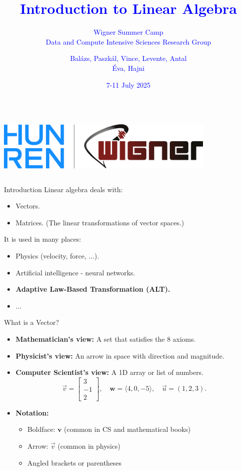 \documentclass{beamer}
\title{\textcolor{blue}{Introduction to Linear Algebra}}
\subtitle{\textcolor{blue}{Wigner Summer Camp \\ Data and Compute Intensive Sciences Research Group}}
\author{\textcolor{blue}{Balázs, Paszkál, Vince, Levente, Antal \\ Éva, Hajni}}
\date{\textcolor{blue}{7-11 July 2025}}
\begin{document}
\begin{frame}
  \titlepage
  \begin{columns}
    \centering
    \centering
    \includegraphics[width=0.8\textwidth]{img/logo.png}
    \centering
  \end{columns}
\end{frame}

\begin{frame}{Introduction}
    Linear algebra deals with:
    \begin{itemize}
        \item Vectors.
        \item Matrices. (The linear transformations of vector spaces.)
    \end{itemize}

    It is used in many places:
    \begin{itemize}
        \item Physics (velocity, force, ...).
        \item Artificial intelligence - neural networks.
        \item \textbf{Adaptive Law-Based Transformation (ALT).} 
        \item ...
    \end{itemize}
\end{frame}

\begin{frame}{What is a Vector?}
  \begin{itemize}
    \item \textbf{Mathematician's view:} A set that satisfies the 8 axioms.
    \item \textbf{Physicist's view:} An arrow in space with direction and magnitude.
    \item \textbf{Computer Scientist's view:} A 1D array or list of numbers.
    \begin{equation}
    \vec{v} = \begin{bmatrix} 3 \\ -1 \\ 2 \end{bmatrix}, \quad
    \mathbf{w} = \langle 4, 0, -5 \rangle, \quad
    \vec{u} = (1, 2, 3).
    \end{equation}
    \item \textbf{Notation:}
    \begin{itemize}
      \item Boldface: $\mathbf{v}$ (common in CS and mathematical books)
      \item Arrow: $\vec{v}$ (common in physics)
      \item Angled brackets or parentheses
    \end{itemize}
  \end{itemize}
\end{frame}
\end{document}
